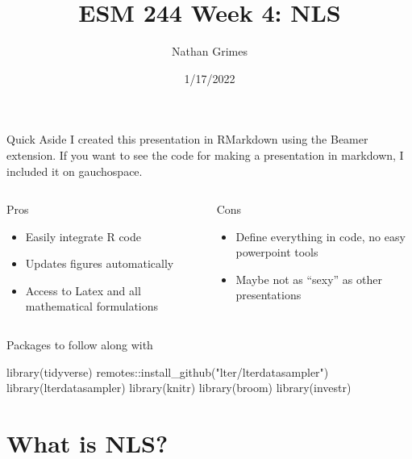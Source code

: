 \documentclass[
  ignorenonframetext,
]{beamer}
\title{ESM 244 Week 4: NLS}
\author{Nathan Grimes}
\date{1/17/2022}
\newenvironment{Shaded}{\begin{snugshade}}{\end{snugshade}}
\newcommand{\FunctionTok}[1]{\textcolor[rgb]{0.00,0.00,0.00}{#1}}
\newcommand{\NormalTok}[1]{#1}
\newcommand{\SpecialCharTok}[1]{\textcolor[rgb]{0.00,0.00,0.00}{#1}}
\newcommand{\StringTok}[1]{\textcolor[rgb]{0.31,0.60,0.02}{#1}}
\providecommand{\tightlist}{%
  \setlength{\itemsep}{0pt}\setlength{\parskip}{0pt}}
\begin{document}
\frame{\titlepage}

\begin{frame}{Quick Aside}
\protect\hypertarget{quick-aside}{}
I created this presentation in RMarkdown using the Beamer extension. If
you want to see the code for making a presentation in markdown, I
included it on gauchospace.

\begin{columns}[T]
\begin{column}{0.48\textwidth}
Pros

\begin{itemize}
\tightlist
\item
  Easily integrate R code
\item
  Updates figures automatically
\item
  Access to Latex and all mathematical formulations
\end{itemize}
\end{column}

\begin{column}{0.48\textwidth}
Cons

\begin{itemize}
\item
  Define everything in code, no easy powerpoint tools
\item
  Maybe not as ``sexy'' as other presentations
\end{itemize}
\end{column}
\end{columns}
\end{frame}

\begin{frame}[fragile]{Packages to follow along with}
\protect\hypertarget{packages-to-follow-along-with}{}
\begin{Shaded}
\begin{Highlighting}[]
\FunctionTok{library}\NormalTok{(tidyverse)}
\NormalTok{remotes}\SpecialCharTok{::}\FunctionTok{install\_github}\NormalTok{(}\StringTok{"lter/lterdatasampler"}\NormalTok{)}
\FunctionTok{library}\NormalTok{(lterdatasampler)}
\FunctionTok{library}\NormalTok{(knitr)}
\FunctionTok{library}\NormalTok{(broom)}
\FunctionTok{library}\NormalTok{(investr)}
\end{Highlighting}
\end{Shaded}
\end{frame}

\hypertarget{what-is-nls}{%
\section{What is NLS?}\label{what-is-nls}}
\end{document}
